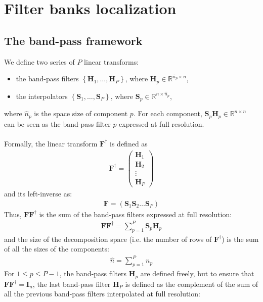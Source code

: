 \documentclass[12pt]{scrartcl}
\begin{document}
\section{Filter banks localization}

\subsection{The band-pass framework}
We define two series of $P$ linear transforms:
\begin{itemize}
\item the band-pass filters $\left\{\mathbf{H}_1,\dots,\mathbf{H}_P\right\}$, where $\mathbf{H}_p \in \mathbb{R}^{\widehat{n}_p \times n}$,
\item the interpolators $\left\{\mathbf{S}_1,\dots,\mathbf{S}_P\right\}$, where $\mathbf{S}_p \in \mathbb{R}^{n \times \widehat{n}_p}$,
\end{itemize}
where $\widehat{n}_p$ is the space size of component $p$. For each component, $\mathbf{S}_p \mathbf{H}_p \in \mathbb{R}^{n \times n}$ can be seen as the band-pass filter $p$ expressed at full resolution.\\
$  $\\
Formally, the linear transform $\mathbf{F}^\dag$ is defined as
\begin{align}
\mathbf{F}^\dag = \left( \begin{array}{c}
\mathbf{H}_1 \\
\mathbf{H}_2 \\
\vdots \\
\mathbf{H}_P
\end{array}
\right)
\end{align}
and its left-inverse as:
\begin{align}
\mathbf{F} = \left(\mathbf{S}_1 \mathbf{S}_2 \dots \mathbf{S}_{P}\right)
\end{align}
Thus, $\mathbf{F} \mathbf{F}^\dag$ is the sum of the band-pass filters expressed at full resolution:
\begin{align}
\mathbf{F} \mathbf{F}^\dag = \sum_{p=1}^P \mathbf{S}_p \mathbf{H}_p
\end{align}
and the size of the decomposition space (i.e. the number of rows of $\mathbf{F}^\dag$) is the sum of all the sizes of the components:
\begin{align}
\widehat{n} = \sum_{p=1}^P n_p
\end{align}
For $1 \le p \le P-1$, the band-pass filters $\mathbf{H}_p$ are defined freely, but to ensure that $\mathbf{F} \mathbf{F}^\dag = \mathbf{I}_n$, the last band-pass filter $\mathbf{H}_P$ is defined as the complement of the sum of all the previous band-pass filters interpolated at full resolution:
\end{document}
